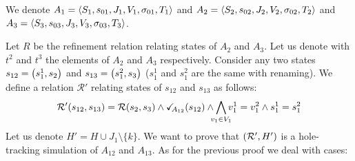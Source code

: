 \documentclass[runningheads]{llncs}
\begin{document}
We denote $A_1=  \left<S_1,s_{01},J_1,V_1,\sigma_{01},T_1\right>$ and \(A_2 = \left<S_2,s_{02},J_2,V_2,\sigma_{02},T_2\right>\) and $A_3 = \left<S_3,s_{03},J_3,V_3,\sigma_{03},T_3\right>$.


Let $R$ be the refinement relation relating states of $A_2$ and $A_3$. 
Let us denote with $t^2$ and $t^3$  the elements of $A_2$ and $A_3$ respectively.
Consider any two states $s_{12} = {\left(s^1_1,s_2\right)}$ and $s_{13} = {\left(s^2_1,s_3\right)}$ ($s^1_1$ and $s^2_1$  are the same with renaming). We define a relation $\mathcal{R}'$ relating states of $s_{12}$ and $s_{13}$ as follows:
\[\mathcal{R}' \mpar{s_{12}, s_{13}} = \mathcal{R}\mpar{s_{2}, s_{3}} \land \reach{A_{12}}(s_{12}) \wedge \bigwedge_\subbox{v_1\in V_1}
 v^1_1=v^2_1\wedge s^1_1 = s^2_1\]
Let us denote $H'=H\cup J_1 \setminus\{k\}$.
We want to prove that ${\left(\mathcal{R}', H'\right)}$  is a hole-tracking simulation of $A_{12}$ and $A_{13}$. As for the previous proof we deal with cases:
\end{document}

